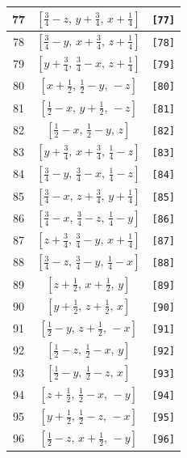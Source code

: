 \documentclass[fleqn,8pt]{jsarticle}
\begin{document}
\begin{longtable}{ccc}
77 & $\left[ \frac{3}{4} - z,\, y + \frac{3}{4},\, x + \frac{1}{4} \right]$ & {\tt [77]} \\ \hline
78 & $\left[ \frac{3}{4} - y,\, x + \frac{3}{4},\, z + \frac{1}{4} \right]$ & {\tt [78]} \\ \hline
79 & $\left[ y + \frac{3}{4},\, \frac{3}{4} - x,\, z + \frac{1}{4} \right]$ & {\tt [79]} \\ \hline
80 & $\left[ x + \frac{1}{2},\, \frac{1}{2} - y,\, - z \right]$ & {\tt [80]} \\ \hline
81 & $\left[ \frac{1}{2} - x,\, y + \frac{1}{2},\, - z \right]$ & {\tt [81]} \\ \hline
82 & $\left[ \frac{1}{2} - x,\, \frac{1}{2} - y,\, z \right]$ & {\tt [82]} \\ \hline
83 & $\left[ y + \frac{3}{4},\, x + \frac{3}{4},\, \frac{1}{4} - z \right]$ & {\tt [83]} \\ \hline
84 & $\left[ \frac{3}{4} - y,\, \frac{3}{4} - x,\, \frac{1}{4} - z \right]$ & {\tt [84]} \\ \hline
85 & $\left[ \frac{3}{4} - x,\, z + \frac{3}{4},\, y + \frac{1}{4} \right]$ & {\tt [85]} \\ \hline
86 & $\left[ \frac{3}{4} - x,\, \frac{3}{4} - z,\, \frac{1}{4} - y \right]$ & {\tt [86]} \\ \hline
87 & $\left[ z + \frac{3}{4},\, \frac{3}{4} - y,\, x + \frac{1}{4} \right]$ & {\tt [87]} \\ \hline
88 & $\left[ \frac{3}{4} - z,\, \frac{3}{4} - y,\, \frac{1}{4} - x \right]$ & {\tt [88]} \\ \hline
89 & $\left[ z + \frac{1}{2},\, x + \frac{1}{2},\, y \right]$ & {\tt [89]} \\ \hline
90 & $\left[ y + \frac{1}{2},\, z + \frac{1}{2},\, x \right]$ & {\tt [90]} \\ \hline
91 & $\left[ \frac{1}{2} - y,\, z + \frac{1}{2},\, - x \right]$ & {\tt [91]} \\ \hline
92 & $\left[ \frac{1}{2} - z,\, \frac{1}{2} - x,\, y \right]$ & {\tt [92]} \\ \hline
93 & $\left[ \frac{1}{2} - y,\, \frac{1}{2} - z,\, x \right]$ & {\tt [93]} \\ \hline
94 & $\left[ z + \frac{1}{2},\, \frac{1}{2} - x,\, - y \right]$ & {\tt [94]} \\ \hline
95 & $\left[ y + \frac{1}{2},\, \frac{1}{2} - z,\, - x \right]$ & {\tt [95]} \\ \hline
96 & $\left[ \frac{1}{2} - z,\, x + \frac{1}{2},\, - y \right]$ & {\tt [96]} \\ \hline

\end{longtable}
\end{document}
